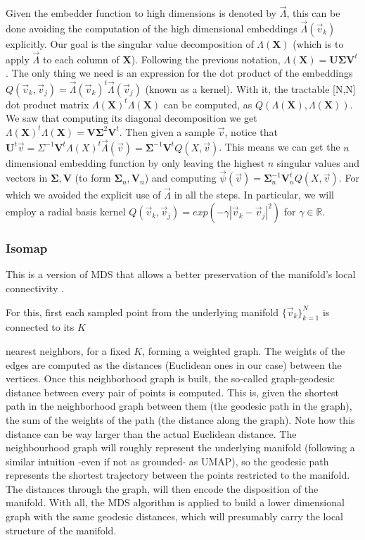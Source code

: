 \documentclass[11pt, a4paper, twoside]{article} %
\newcommand{\R}{\mathbb{R}} %
\DeclareRobustCommand{\mybox}[2][gray!10]{%
\begin{tcolorbox}[   %
        left=0.2cm,
        right=0.2cm,
        top=0.15cm,
        bottom=0.15cm,
        colback=#1,
        colframe=#1,
        width=\dimexpr\textwidth\relax, 
        enlarge left by=0mm,
        boxsep=5pt,
        arc=0pt,outer arc=0pt,
        ]
        #2
\end{tcolorbox}
}
\begin{document}
\mybox{Given the embedder function to high dimensions is denoted by $\vec{\Lambda}$, this can be done avoiding the computation of the high dimensional embeddings $\vec{\Lambda}(\vec{v}_k)$ explicitly. Our goal is the singular value decomposition of $\Lambda(\pmb{X})$ (which is to apply $\vec{\Lambda}$ to each column of $\pmb{X}$). Following the previous notation, $\Lambda(\pmb{X})=\pmb{U}\pmb{\Sigma}\pmb{V}^t$. The only thing we need is an expression for the dot product of the embeddings $Q(\vec{v}_k, \vec{v}_j)=\vec{\Lambda}(\vec{v}_k)^t\vec{\Lambda}(\vec{v}_j)$ (known as a kernel). With it, the tractable [N,N] dot product matrix $\Lambda(\pmb{X})^t\Lambda(\pmb{X})$ can be computed, as $Q(\Lambda(\pmb{X}), \Lambda(\pmb{X}))$. We saw that computing its diagonal decomposition we get $\Lambda(\pmb{X})^t\Lambda(\pmb{X})=\pmb{V}\pmb{\Sigma}^2\pmb{V}^t$. Then given a sample $\vec{v}$, notice that $\pmb{U}^t\vec{v}=\Sigma^{-1}\pmb{V}^t\Lambda(X)^t\vec{\Lambda}(\vec{v})=\pmb{\Sigma}^{-1}\pmb{V}^tQ(X,\vec{v})$. This means we can get the $n$ dimensional embedding function by only leaving the highest $n$ singular values and vectors in $\pmb{\Sigma},\pmb{V}$ (to form $\pmb{\Sigma}_n,\pmb{V}_n$) and computing $\vec{\psi}(\vec{v})=\pmb{\Sigma}_n^{-1}\pmb{V}_n^tQ(X,\vec{v})$. For which we avoided the explicit use of $\vec{\Lambda}$ in all the steps. In particular, we will employ a radial basis kernel $Q(\vec{v}_k,\vec{v}_j)=exp(-\gamma |\vec{v}_k-\vec{v}_j|^2)$ for $\gamma\in\R$.
}
\vspace{-0.55cm}

\subsubsection*{Isomap}\vspace{-0.2cm}
This is a version of MDS that allows a better preservation of the manifold's local connectivity \cite{isomap}. 

\mybox{For this, first each sampled point from the underlying manifold $\{\vec{v}_k\}_{k=1}^N$ is connected to its $K$}\mybox{  nearest neighbors, for a fixed $K$, forming a weighted graph. The weights of the edges are computed as the distances (Euclidean ones in our case) between the vertices. Once this neighborhood graph is built, the so-called graph-geodesic distance between every pair of points is computed. This is, given the shortest path in the neighborhood graph between them (the geodesic path in the graph), the sum of the weights of the path (the distance along the graph). Note how this distance can be way larger than the actual Euclidean distance. The neighbourhood graph will roughly represent the underlying manifold (following a similar intuition -even if not as grounded- as UMAP), so the geodesic path represents the shortest trajectory between the points restricted to the manifold. The distances through the graph, will then encode the disposition of the manifold. With all, the MDS algorithm is applied to build a lower dimensional graph with the same geodesic distances, which will presumably carry the local structure of the manifold. %
}
\vspace{-0.35cm}
\end{document}
